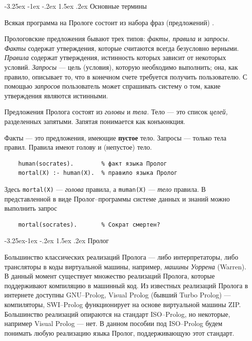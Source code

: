 \documentclass[12pt, openany, twoside]{book} %
\makeatletter
\renewcommand\section{\@startsection {section}{1}{\z@}%
                                   {-3.25ex \@plus -1ex \@minus -.2ex}%
                                   {1.5ex \@plus.2ex}%
                                   {\normalfont\large\bfseries}}
\renewcommand\subsection{\@startsection{subsection}{2}{\z@}%
                                     {-3.25ex\@plus -1ex \@minus -.2ex}%
                                     {1.5ex \@plus .2ex}%
                                     {\normalfont\normalsize\bfseries}}
\makeatother
\begin{document}
\section{Основные термины}

Всякая программа на Прологе состоит из набора фраз (предложений) \cite{Bratko}.

Прологовские предложения бывают трех типов: \emph{факты, правила} и \emph{запросы.} \emph{Факты} содержат утверждения, которые считаются всегда безусловно верными. \emph{Правила} содержат утверждения, истинность которых зависит от некоторых условий. \emph{Запросы} --- цель (условия), которую необходимо выполнить; она, как правило, описывает то, что в конечном счете требуется получить пользователю. С помощью \emph{запросов} пользователь может спрашивать систему о том, какие утверждения являются истинными.

Предложения Пролога состоят из \emph{головы} и \emph{тела.} Тело --- это список \emph{целей,} разделенных запятыми. Запятая понимается как конъюнкция.

Факты --- это предложения, имеющие {\bf пустое} тело. Запросы --- только тела правил. Правила имеют голову и (непустое) тело.

{\tt\begin{verbatim}
    human(socrates).        % факт языка Пролог
    mortal(X) :- human(X).  % правило языка Пролог
\end{verbatim}}

Здесь {\tt mortal(X)} --- {\em голова} правила, а {\tt muman(X)} --- {\em тело} правила. В представленной в виде Пролог--программы системе данных и знаний можно выполнить запрос
{\tt\begin{verbatim}
    mortal(socrates).       % Сократ смертен?
\end{verbatim}}


\subsection{Пролог}

Большинство классических реализаций Пролога --- либо интерпретаторы, либо трансляторы в коды виртуальной машины, например, {\em машины Уоррена} (Warren). В данный момент существует множество реализаций Пролога, которые поддерживают компиляцию в машинный код. Из известных реализаций Пролога в интернете доступны GNU--Prolog, Visual Prolog (бывший Turbo Prolog) --- компиляторы, SWI--Prolog функционирует на основе виртуальной машины ZIP. Большинство реализаций опираются на стандарт ISO--Prolog, но некоторые, например Visual Prolog --- нет. В данном пособии под ISO--Prolog будем понимать любую реализацию языка Пролог, поддерживающую этот стандарт.
\end{document}

